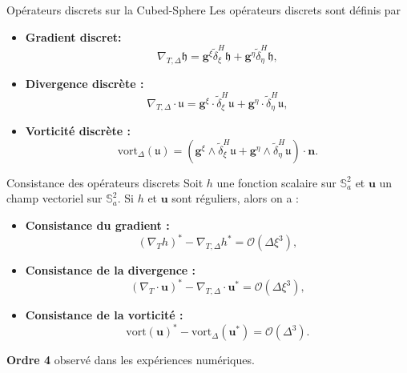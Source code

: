 \documentclass[11pt]{beamer}
\def\dxi{\tilde{\delta}^H_{\xi}}
\def\deta{\tilde{\delta}^H_{\eta}}
\begin{document}
\begin{frame}{Opérateurs discrets sur la Cubed-Sphere}
Les opérateurs discrets sont définis par
\begin{block}{}
\begin{itemize}
\item \textbf{Gradient discret:}
$$
\nabla_{T,\Delta} \mathfrak{h} = \mathbf{g}^{\xi} \dxi \mathfrak{h} + \mathbf{g}^{\eta} \deta \mathfrak{h},
$$
\item \textbf{Divergence discrète :}
$$
\nabla_{T,\Delta} \cdot \mathfrak{u} = \mathbf{g}^{\xi} \cdot \dxi \mathfrak{u} + \mathbf{g}^{\eta} \cdot \deta \mathfrak{u},
$$
\item \textbf{Vorticité discrète :}
$$
\text{vort}_{\Delta} (\mathfrak{u}) = \left( \mathbf{g}^{\xi} \wedge \dxi \mathfrak{u} + \mathbf{g}^{\eta} \wedge \deta \mathfrak{u} \right) \cdot \mathbf{n}.
$$
\end{itemize}
\end{block}
\end{frame}




\begin{frame}{Consistance des opérateurs discrets}
Soit $h$ une fonction scalaire sur $\mathbb{S}_a^2$ et $\mathbf{u}$ un champ vectoriel sur $\mathbb{S}_a^2$. Si $h$ et $\mathbf{u}$ sont réguliers, alors on a :
\begin{block}{}
\begin{itemize}
\item \textbf{Consistance du gradient :}
$$
(\nabla_T h)^* - \nabla_{T,\Delta} h^* = \mathcal{O}(\Delta \xi^3),
$$
\item \textbf{Consistance de la divergence :}
$$
(\nabla_T \cdot \mathbf{u})^* - \nabla_{T,\Delta} \cdot \mathbf{u}^* = \mathcal{O}(\Delta \xi^3),
$$
\item \textbf{Consistance de la vorticité :}
$$
\text{vort}(\mathbf{u})^* - \text{vort}_{\Delta}(\mathbf{u}^*) = \mathcal{O}(\Delta^3).
$$
\end{itemize}
\end{block}

\begin{alertblock}{}
\textbf{Ordre 4} observé dans les expériences numériques.
\end{alertblock}
\end{frame}
\end{document}
